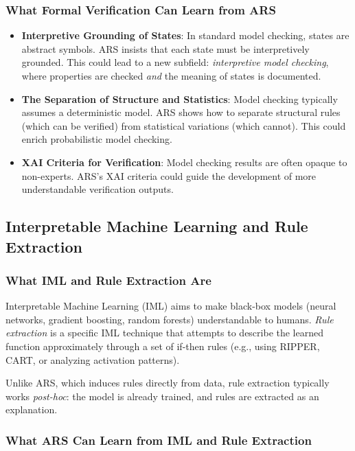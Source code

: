 \documentclass[12pt,a4paper]{article}
\begin{document}
\subsubsection{What Formal Verification Can Learn from ARS}

\begin{itemize}
    \item \textbf{Interpretive Grounding of States}: In standard model checking, 
    states are abstract symbols. ARS insists that each state must be 
    interpretively grounded. This could lead to a new subfield: \textit{interpretive 
    model checking}, where properties are checked \textit{and} the meaning of 
    states is documented.
    
    \item \textbf{The Separation of Structure and Statistics}: Model checking 
    typically assumes a deterministic model. ARS shows how to separate 
    structural rules (which can be verified) from statistical variations 
    (which cannot). This could enrich probabilistic model checking.
    
    \item \textbf{XAI Criteria for Verification}: Model checking results are 
    often opaque to non-experts. ARS's XAI criteria could guide the development 
    of more understandable verification outputs.
\end{itemize}

\subsection{Interpretable Machine Learning and Rule Extraction}

\subsubsection{What IML and Rule Extraction Are}

Interpretable Machine Learning (IML) aims to make black-box models (neural 
networks, gradient boosting, random forests) understandable to humans. 
\textit{Rule extraction} is a specific IML technique that attempts to describe 
the learned function approximately through a set of if-then rules (e.g., using 
RIPPER, CART, or analyzing activation patterns).

Unlike ARS, which induces rules directly from data, rule extraction typically 
works \textit{post-hoc}: the model is already trained, and rules are extracted 
as an explanation.

\subsubsection{What ARS Can Learn from IML and Rule Extraction}
\end{document}
